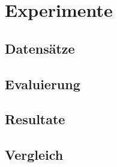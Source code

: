 \chapter{Experimente}
\label{chap:experimente}

\section{Datensätze}

\section{Evaluierung}

\section{Resultate}

\section{Vergleich}